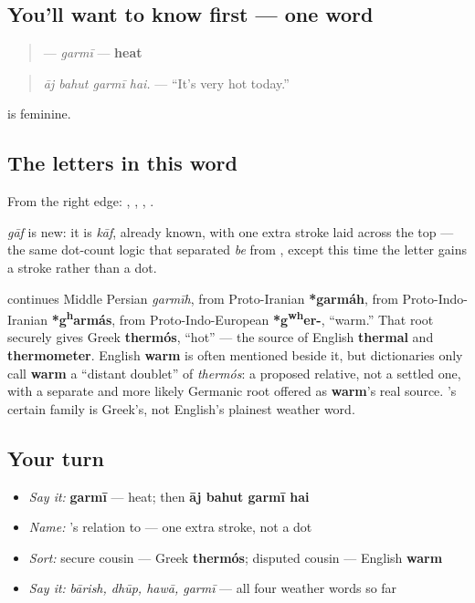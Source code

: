 \subsection*{You'll want to know first — one word}
\begin{quote}
\textbf{} — \emph{garmī} — \textbf{heat}
\end{quote}

\begin{quote}
\emph{āj bahut garmī hai.} — \textquotedblleft{}It's very hot today.\textquotedblright{}
\end{quote}

\textbf{} is feminine.

\subsection*{The letters in this word}
From the right edge: \textbf{}, \textbf{}, \textbf{}, \textbf{}.

\textbf{} \emph{gāf} is new: it is \textbf{} \emph{kāf}, already known, with one extra stroke laid across the top — the same dot-count logic that separated \emph{be} from \textbf{}, except this time the letter gains a stroke rather than a dot.

\begin{cousinweb}
\textbf{} continues Middle Persian \emph{garmīh}, from Proto-Iranian \textbf{*garmáh}, from Proto-Indo-Iranian \textbf{*g\textsuperscript{h}armás}, from Proto-Indo-European \textbf{*g\textsuperscript{w}\textsuperscript{h}er-}, \textquotedblleft{}warm.\textquotedblright{} That root securely gives Greek \textbf{thermós}, \textquotedblleft{}hot\textquotedblright{} — the source of English \textbf{thermal} and \textbf{thermometer}. English \textbf{warm} is often mentioned beside it, but dictionaries only call \textbf{warm} a \textquotedblleft{}distant doublet\textquotedblright{} of \emph{thermós}: a proposed relative, not a settled one, with a separate and more likely Germanic root offered as \textbf{warm}'s real source. \textbf{}'s certain family is Greek's, not English's plainest weather word.
\end{cousinweb}

\subsection*{Your turn}
\begin{itemize}
\raggedright
  \item \emph{Say it:} \textbf{garmī} — heat; then \textbf{āj bahut garmī hai}
  \item \emph{Name:} \textbf{}'s relation to \textbf{} — one extra stroke, not a dot
  \item \emph{Sort:} secure cousin — Greek \textbf{thermós}; disputed cousin — English \textbf{warm}
  \item \emph{Say it:} \emph{bārish, dhūp, hawā, garmī} — all four weather words so far
\end{itemize}

